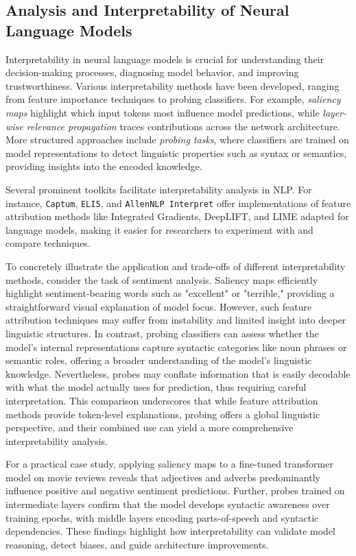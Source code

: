 \documentclass[sigconf]{acmart}
\begin{document}
\subsection{Analysis and Interpretability of Neural Language Models}

Interpretability in neural language models is crucial for understanding their decision-making processes, diagnosing model behavior, and improving trustworthiness. Various interpretability methods have been developed, ranging from feature importance techniques to probing classifiers. For example, \emph{saliency maps} highlight which input tokens most influence model predictions, while \emph{layer-wise relevance propagation} traces contributions across the network architecture. More structured approaches include \emph{probing tasks}, where classifiers are trained on model representations to detect linguistic properties such as syntax or semantics, providing insights into the encoded knowledge.

Several prominent toolkits facilitate interpretability analysis in NLP. For instance, \texttt{Captum}, \texttt{ELI5}, and \texttt{AllenNLP Interpret} offer implementations of feature attribution methods like Integrated Gradients, DeepLIFT, and LIME adapted for language models, making it easier for researchers to experiment with and compare techniques.

To concretely illustrate the application and trade-offs of different interpretability methods, consider the task of sentiment analysis. Saliency maps efficiently highlight sentiment-bearing words such as "excellent" or "terrible," providing a straightforward visual explanation of model focus. However, such feature attribution techniques may suffer from instability and limited insight into deeper linguistic structures. In contrast, probing classifiers can assess whether the model’s internal representations capture syntactic categories like noun phrases or semantic roles, offering a broader understanding of the model's linguistic knowledge. Nevertheless, probes may conflate information that is easily decodable with what the model actually uses for prediction, thus requiring careful interpretation. This comparison underscores that while feature attribution methods provide token-level explanations, probing offers a global linguistic perspective, and their combined use can yield a more comprehensive interpretability analysis.

For a practical case study, applying saliency maps to a fine-tuned transformer model on movie reviews reveals that adjectives and adverbs predominantly influence positive and negative sentiment predictions. Further, probes trained on intermediate layers confirm that the model develops syntactic awareness over training epochs, with middle layers encoding parts-of-speech and syntactic dependencies. These findings highlight how interpretability can validate model reasoning, detect biases, and guide architecture improvements.
\end{document}
